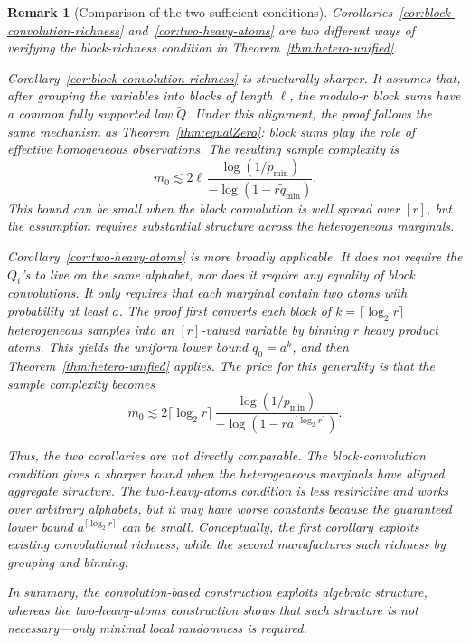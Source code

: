 \documentclass[journal]{IEEEtran}
\newtheorem{remark}{Remark}
\newcommand{\1}{\mathbf{1}}
\begin{document}
\begin{remark}[Comparison of the two sufficient conditions]
Corollaries~\ref{cor:block-convolution-richness} and~\ref{cor:two-heavy-atoms} are two different ways of verifying the block-richness condition in Theorem~\ref{thm:hetero-unified}.

Corollary~\ref{cor:block-convolution-richness} is structurally sharper. It assumes that, after grouping the variables into blocks of length $\ell$, the modulo-$r$ block sums have a common fully supported law $\widetilde Q$. Under this alignment, the proof follows the same mechanism as Theorem~\ref{thm:equalZero}: block sums play the role of effective homogeneous observations. The resulting sample complexity is
$$
m_0
\lesssim
2\ell\,
\frac{\log(1/p_{\min})}{-\log(1-r\widetilde q_{\min})}.
$$
This bound can be small when the block convolution is well spread over $[r]$, but the assumption requires substantial structure across the heterogeneous marginals.

Corollary~\ref{cor:two-heavy-atoms} is more broadly applicable. It does not require the $Q_i$'s to live on the same alphabet, nor does it require any equality of block convolutions. It only requires that each marginal contain two atoms with probability at least $a$. The proof first converts each block of $k=\lceil\log_2 r\rceil$ heterogeneous samples into an $[r]$-valued variable by binning $r$ heavy product atoms. This yields the uniform lower bound $q_0=a^k$, and then Theorem~\ref{thm:hetero-unified} applies. The price for this generality is that the sample complexity becomes
$$
m_0
\lesssim
2\lceil\log_2 r\rceil\,
\frac{\log(1/p_{\min})}{-\log(1-r a^{\lceil\log_2 r\rceil})}.
$$

Thus, the two corollaries are not directly comparable. The block-convolution condition gives a sharper bound when the heterogeneous marginals have aligned aggregate structure. The two-heavy-atoms condition is less restrictive and works over arbitrary alphabets, but it may have worse constants because the guaranteed lower bound $a^{\lceil\log_2 r\rceil}$ can be small. Conceptually, the first corollary exploits existing convolutional richness, while the second manufactures such richness by grouping and binning.

In summary, the convolution-based construction exploits algebraic structure, whereas the two-heavy-atoms construction shows that such structure is not necessary—only minimal local randomness is required.
\end{remark}
\end{document}
